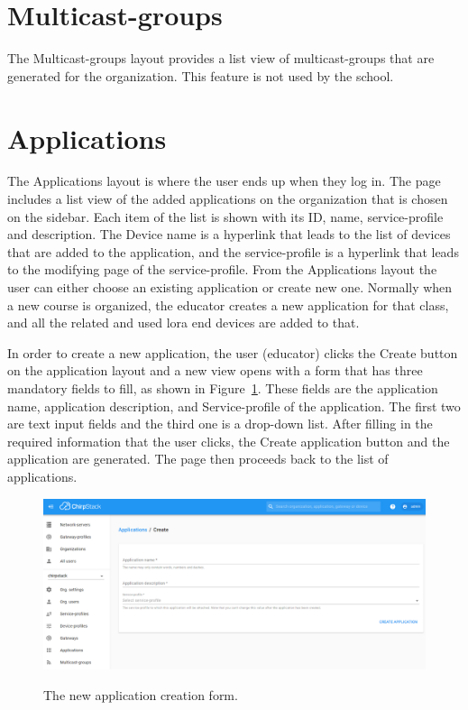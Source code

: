 \section{Multicast-groups}
The Multicast-groups layout provides a list view of multicast-groups that are generated for the organization.
This feature is not used by the school.

\section{Applications}
The Applications layout is where the user ends up when they log in.
The page includes a list view of the added applications on the organization that is chosen on the sidebar.
Each item of the list is shown with its ID, name, service-profile and description.
The Device name is a hyperlink that leads to the list of devices that are added to the application, and the service-profile is a hyperlink that leads to the modifying page of the service-profile.
From the Applications layout the user can either choose an existing application or create new one.
Normally when a new course is organized, the educator creates a new application for that class, and all the related and used \gls{lora} end devices are added to that.

In order to create a new application, the user (educator) clicks the Create button on the application layout and a new view opens with a form that has three mandatory fields to fill, as shown in Figure~\ref{fig:ChirpStack_new_application}.
These fields are the application name, application description, and Service-profile of the application.
The first two are text input fields and the third one is a drop-down list.
After filling in the required information that the user clicks, the Create application button and the application are generated.
The page then proceeds back to the list of applications.

\begin{figure}[ht]
  \centering
  {\includegraphics[width=\textwidth]{illustration/ChirpStack_new_application.png}}
  \caption{The new application creation form.}
  \label{fig:ChirpStack_new_application}
\end{figure}

